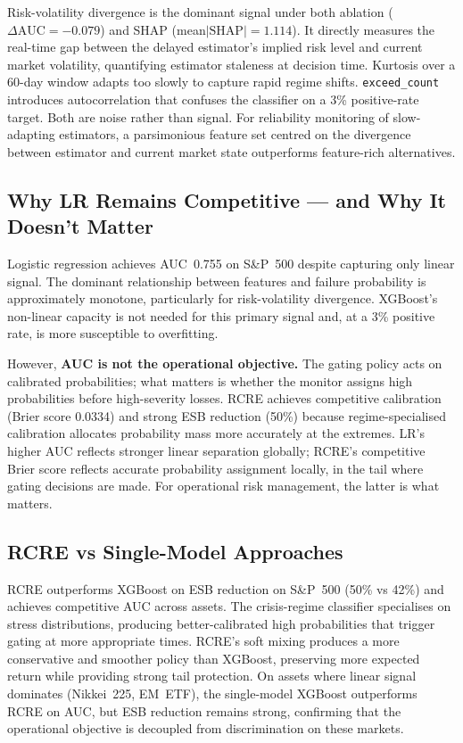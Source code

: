 \documentclass[sigconf]{acmart}
\begin{document}
Risk-volatility divergence is the dominant signal under both ablation ($\Delta\text{AUC} = -0.079$) and SHAP (mean$|\text{SHAP}| = 1.114$). It directly measures the real-time gap between the delayed estimator's implied risk level and current market volatility, quantifying estimator staleness at decision time. Kurtosis over a 60-day window adapts too slowly to capture rapid regime shifts. \texttt{exceed\_count} introduces autocorrelation that confuses the classifier on a 3\% positive-rate target. Both are noise rather than signal. For reliability monitoring of slow-adapting estimators, a parsimonious feature set centred on the divergence between estimator and current market state outperforms feature-rich alternatives.

\subsection{Why LR Remains Competitive --- and Why It Doesn't Matter}
\label{sec:rcr-lr}

Logistic regression achieves AUC~0.755 on S\&P~500 despite capturing only linear signal. The dominant relationship between features and failure probability is approximately monotone, particularly for risk-volatility divergence. XGBoost's non-linear capacity is not needed for this primary signal and, at a 3\% positive rate, is more susceptible to overfitting.

However, \textbf{AUC is not the operational objective.} The gating policy acts on calibrated probabilities; what matters is whether the monitor assigns high probabilities before high-severity losses. RCRE achieves competitive calibration (Brier score 0.0334) and strong ESB reduction (50\%) because regime-specialised calibration allocates probability mass more accurately at the extremes. LR's higher AUC reflects stronger linear separation globally; RCRE's competitive Brier score reflects accurate probability assignment locally, in the tail where gating decisions are made. For operational risk management, the latter is what matters.

\subsection{RCRE vs Single-Model Approaches}

RCRE outperforms XGBoost on ESB reduction on S\&P~500 (50\% vs 42\%) and achieves competitive AUC across assets. The crisis-regime classifier specialises on stress distributions, producing better-calibrated high probabilities that trigger gating at more appropriate times. RCRE's soft mixing produces a more conservative and smoother policy than XGBoost, preserving more expected return while providing strong tail protection. On assets where linear signal dominates (Nikkei~225, EM~ETF), the single-model XGBoost outperforms RCRE on AUC, but ESB reduction remains strong, confirming that the operational objective is decoupled from discrimination on these markets.
\end{document}
